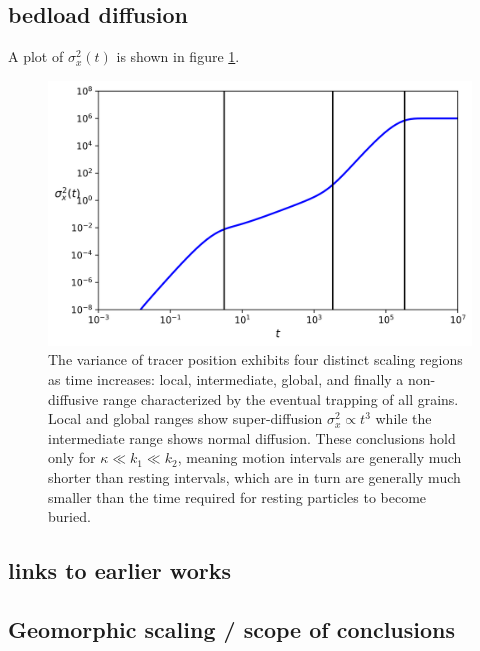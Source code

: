 \documentclass[]{agujournal2018}
\begin{document}
\subsection{bedload diffusion}
A plot of $\sigma_x^2(t)$ is shown in figure \ref{fig:var}.
\begin{figure}
	\includegraphics[width=\linewidth,keepaspectratio]{./figures/diffusion.png}
	\caption{The variance of tracer position exhibits four distinct scaling regions as time increases: local, intermediate, global, and finally a non-diffusive range characterized by the eventual trapping of all grains.
	Local and global ranges show super-diffusion $\sigma_x^2 \propto t^3$ while the intermediate range shows normal diffusion. These conclusions hold only for $\kappa \ll k_1 \ll k_2$, meaning motion intervals are generally much shorter than resting intervals, which are in turn are generally much smaller than the time required for resting particles to become buried.}
	\label{fig:var}
\end{figure}


\subsection{links to earlier works}


\subsection{Geomorphic scaling / scope of conclusions}
\end{document}
